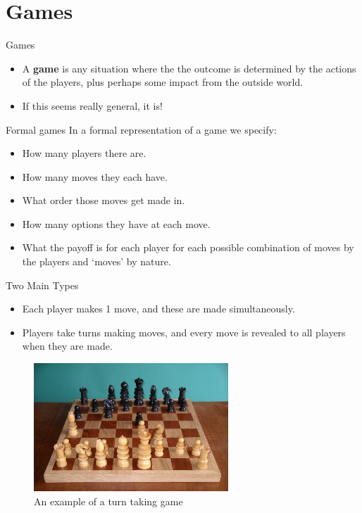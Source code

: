\documentclass[
  ignorenonframetext,
]{beamer}
\providecommand{\tightlist}{%
  \setlength{\itemsep}{0pt}\setlength{\parskip}{0pt}}
\begin{document}
\hypertarget{games}{%
\section{Games}\label{games}}

\begin{frame}{Games}
\protect\hypertarget{games-1}{}
\begin{itemize}[<+->]
\tightlist
\item
  A \textbf{game} is any situation where the the outcome is determined
  by the actions of the players, plus perhaps some impact from the
  outside world.
\item
  If this seems really general, it is!
\end{itemize}
\end{frame}

\begin{frame}{Formal games}
\protect\hypertarget{formal-games}{}
In a formal representation of a game we specify:

\begin{itemize}[<+->]
\tightlist
\item
  How many players there are.
\item
  How many moves they each have.
\item
  What order those moves get made in.
\item
  How many options they have at each move.
\item
  What the payoff is for each player for each possible combination of
  moves by the players and `moves' by nature.
\end{itemize}
\end{frame}

\begin{frame}{Two Main Types}
\protect\hypertarget{two-main-types}{}
\begin{itemize}[<+->]
\tightlist
\item
  Each player makes 1 move, and these are made simultaneously.
\item
  Players take turns making moves, and every move is revealed to all
  players when they are made.
\end{itemize}
\end{frame}

\begin{frame}
\begin{figure}
\centering
\includegraphics[width=0.65\textwidth,height=0.65\textheight]{images/chess_board.jpg}
\caption{An example of a turn taking game}
\end{figure}
\end{frame}
\end{document}
